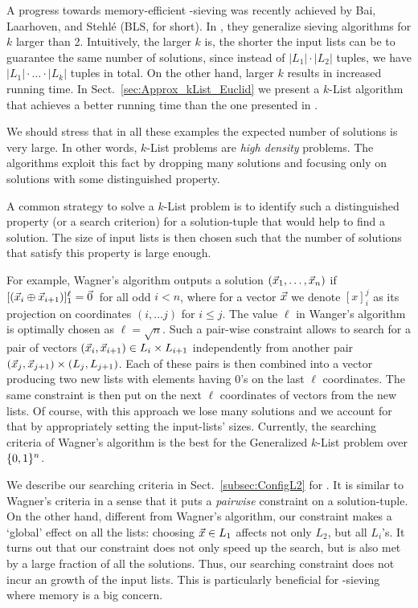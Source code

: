 A progress towards memory-efficient \SVP-sieving was recently achieved by Bai, Laarhoven, and Stehl\'{e} (BLS, for short). In \cite{BLS16}, they generalize sieving algorithms for $k$ larger than 2. Intuitively, the larger $k$ is, the shorter the input lists can be to guarantee the same number of solutions, since instead of $|L_1| \cdot |L_2|$ tuples, we have $|L_1| \cdot \ldots \cdot |L_k|$ tuples in total. On the other hand, larger $k$ results in increased running time. In Sect.~\ref{sec:Approx_kList_Euclid} we present a $k$-List algorithm that achieves a better running time than the one presented in \cite{BLS16}.

We should stress that in all these examples the expected number of solutions is very large. In other words, $k$-List problems are \emph{high density} problems. The algorithms exploit this fact by dropping many solutions and focusing only on solutions with some distinguished property. 

A common strategy to solve a $k$-List problem is to identify such a distinguished property (or a search criterion) for a solution-tuple that would help to find a solution. The size of input lists is then chosen such that the number of solutions that satisfy this property is large enough.

For example, Wagner's algorithm \cite{C:Wagner02} outputs a solution $(\vec x_1, \ldots, \vec x_n)$ if $[(\xvec_i \oplus \xvec_{i+1})]_{1}^{\ell} = \zerovec$ for all odd $i<n$, where for a vector $\vec x$ we denote $[x]_i^j$ as its projection on coordinates $(i, \ldots j)$ for $i \leq j$. The value $\ell$  in Wanger's algorithm is optimally chosen as $\ell = \sqrt{n}$. Such a pair-wise constraint allows to search for a pair of vectors $(\vec x_i, \vec x_{i+1}) \in L_i \times L_{i+1}$ independently from another pair $(\vec x_j, \vec x_{j+1}) \times (L_j, L_{j+1})$. Each of these pairs is then combined into a vector producing two new lists with elements having 0's on the last $\ell$ coordinates. The same constraint is then put on the next $\ell$ coordinates of vectors from the new lists. Of course, with this approach we lose many solutions and we account for that by appropriately setting the input-lists' sizes. Currently, the searching criteria of Wagner's algorithm is the best for the Generalized $k$-List problem over $\{0,1 \}^{n}$.

We describe our searching criteria in Sect.~\ref{subsec:ConfigL2} for \SVP. It is similar to Wagner's criteria in a sense that it puts a \emph{pairwise} constraint on a solution-tuple. On the other hand, different from Wagner's algorithm, our constraint makes a `global' effect on all the lists: choosing $\vec x \in L_1$ affects not only $L_2$, but all $L_i$'s. It turns out that our constraint does not only speed up the search, but is also met by a large fraction of all the solutions. Thus, our searching constraint does not incur an growth of the input lists. This is particularly beneficial for \SVP-sieving where memory is a big concern.  

